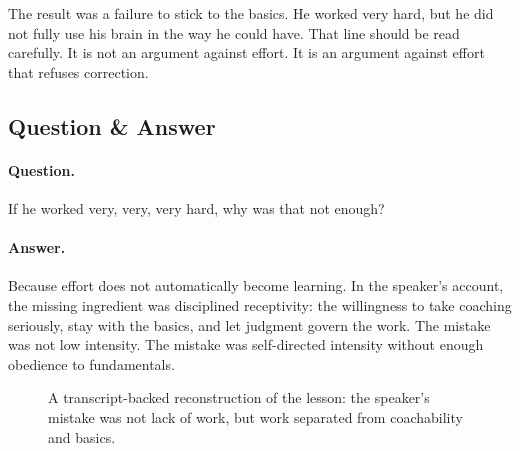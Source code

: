 The result was a failure to stick to the basics. He worked very hard, but he did not fully use his brain in the way he could have. That line should be read carefully. It is not an argument against effort. It is an argument against effort that refuses correction.

\subsection{Question \& Answer}

\paragraph{Question.}
If he worked very, very, very hard, why was that not enough?

\paragraph{Answer.}
Because effort does not automatically become learning. In the speaker's account, the missing ingredient was disciplined receptivity: the willingness to take coaching seriously, stay with the basics, and let judgment govern the work. The mistake was not low intensity. The mistake was self-directed intensity without enough obedience to fundamentals.

\begin{figure}
\centering
{}
\caption{A transcript-backed reconstruction of the lesson: the speaker's mistake was not lack of work, but work separated from coachability and basics.}
\end{figure}

